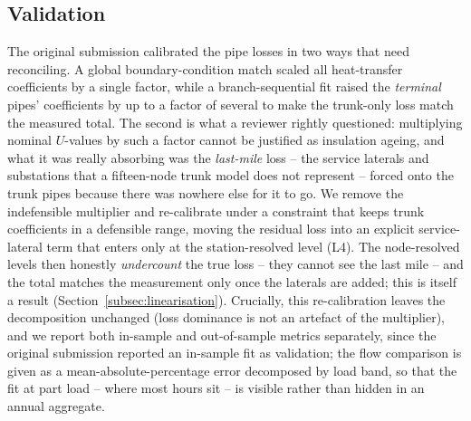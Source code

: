 \documentclass[a4paper,fleqn]{cas-dc}
\begin{document}
\subsection{Validation}

The original submission calibrated the pipe losses in two ways that need reconciling. A global
boundary-condition match scaled all heat-transfer coefficients by a single factor, while a
branch-sequential fit raised the \emph{terminal} pipes' coefficients by up to a factor of
several to make the trunk-only loss match the measured total. The second is what a reviewer
rightly questioned: multiplying nominal $U$-values by such a factor cannot be justified as
insulation ageing, and what it was really absorbing was the \emph{last-mile} loss -- the service
laterals and substations that a fifteen-node trunk model does not represent -- forced onto the
trunk pipes because there was nowhere else for it to go. We remove the indefensible multiplier
and re-calibrate under a constraint that keeps trunk coefficients in a defensible range, moving
the residual loss into an explicit service-lateral term that enters only at the station-resolved
level (L4). The node-resolved levels then honestly \emph{undercount} the true loss -- they cannot
see the last mile -- and the total matches the measurement only once the laterals are added; this
is itself a result (Section~\ref{subsec:linearisation}). Crucially, this re-calibration leaves
the decomposition unchanged (loss dominance is not an artefact of the multiplier), and we report
both in-sample and out-of-sample metrics separately, since the original submission reported an
in-sample fit as validation; the flow comparison is given as a mean-absolute-percentage error
decomposed by load band, so that the fit at part load -- where most hours sit -- is visible
rather than hidden in an annual aggregate.
\end{document}
